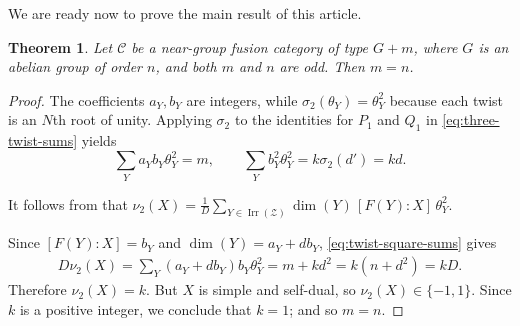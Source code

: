 \documentclass[a4paper,twoside,11pt]{amsart}
\newtheorem{theorem}{Theorem}[section]
\theoremstyle{plain} %
\theoremstyle{definition}
\begin{document}
We are ready now to prove the main result of this article. 
\begin{theorem}\label{prop:k-equals-one}
Let $\mathcal C$ be a  near-group fusion category of type $G+m$, where $G$ is an abelian group of order $n$, and both $m$ and $n$ are odd. Then $m=n$.
\end{theorem}
\begin{proof}
    
The coefficients $a_Y,b_Y$ are integers, while
$\sigma_2(\theta_Y)=\theta_Y^2$ because each twist is an
$N$th root of unity. Applying $\sigma_2$ to the identities
for $P_1$ and $Q_1$ in \eqref{eq:three-twist-sums} yields
\begin{equation}\label{eq:twist-square-sums}
\sum_Ya_Yb_Y\theta_Y^2=m,
\qquad \sum_Yb_Y^2\theta_Y^2=k\sigma_2(d')=kd.
\end{equation}

It follows from \cite[Theorem 4.1]{NS} that $\nu_2(X)=\frac{1}{D}
\sum_{Y\in\operatorname{Irr}(\mathcal Z)}
\dim(Y)\,[F(Y):X]\,\theta_Y^2$.
\medskip

Since $[F(Y):X]=b_Y$ and $\dim(Y)=a_Y+db_Y$,
\eqref{eq:twist-square-sums} gives
\begin{align*}
D\nu_2(X)
=\sum_Y(a_Y+db_Y)b_Y\theta_Y^2
=m+kd^2=k(n+d^2)=
kD.
\end{align*}
Therefore $\nu_2(X)=k$. But $X$ is simple and self-dual, so $\nu_2(X)\in\{-1,1\}$.
Since $k$ is a positive integer, we conclude that $k=1$; and so $m=n$.

\end{proof}
\medskip
\end{document}
